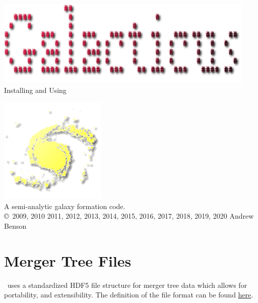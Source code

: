 \documentclass[letterpaper,10pt,headsepline]{scrbook}
\begin{document}
\lstset{language=[95]Fortran}

\frontmatter

\pagestyle{empty}
\begin{center}
\includegraphics[width=125mm]{GalacticusLogo.png}\\

\Huge Installing and Using \normalsize

\includegraphics{New_Logo_Galaxy_192_Transparent.png}\\
A semi-analytic galaxy formation code.\\

\copyright\ 2009, 2010 2011, 2012, 2013, 2014, 2015, 2016, 2017, 2018, 2019, 2020 Andrew Benson
\end{center}

\tableofcontents

\mainmatter
\pagestyle{headings}












\backmatter

\appendix

\chapter{Merger Tree Files}

\glc\ uses a standardized HDF5 file structure for merger tree data which allows for portability, and extensibility. The definition of the file format can be found \href{https://github.com/galacticusorg/galacticus/wiki/Merger-Tree-File-Format}{here}.










\printglossaries

\citeindextrue
\printindex
\end{document}
